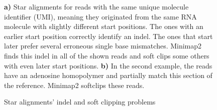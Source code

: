 \begin{figure}[th!]


\begin{centering}
\caption{Star alignments' indel and soft clipping problems}\label{fig:softclipping}



\textbf{a)} Star alignments for reads with the same unique molecule identifier (UMI), meaning they originated from the same RNA molecule with slightly different start positions. The ones with an earlier start position correctly identify an indel. The ones that start later prefer several erroneous single base mismatches. Minimap2 finds this indel in all of the shown reads and soft clips some others with even later start positions. \textbf{b)} In the second example, the reads have an adenosine homopolymer and partially match this section of the reference. Minimap2 softclips these reads. 
\end{centering}
\end{figure}

